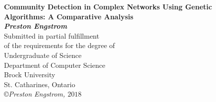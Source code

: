\begin{titlepage}
\begin{center}

{\LARGE {\bf 
Community Detection in Complex Networks Using Genetic Algorithms: \linebreak 
A Comparative Analysis}}
\\[3cm]
{\large{ \bf \textit{Preston Engstrom}}}
\\[3cm]
{\large Submitted in partial fulfillment\\ of the requirements for the degree of\\ [1cm]
Undergraduate of Science}
\\[4cm]
{\large Department of Computer Science\\Brock University\\
St. Catharines, Ontario}
\\[5cm]
\copyright \textit{Preston Engstrom, $ 2018 $}

\end{center}
\end{titlepage}

  